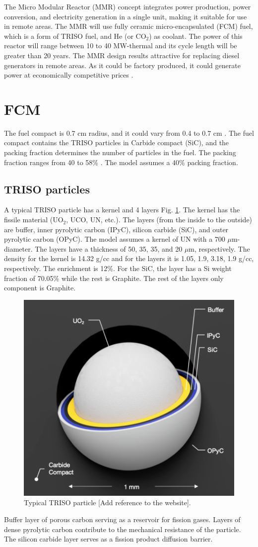 The Micro Modular Reactor (MMR) concept integrates power production, power conversion, and electricity generation in a single unit, making it suitable for use in remote areas. 
The MMR will use fully ceramic micro-encapsulated (FCM) fuel, which is a form of TRISO fuel, and He (or CO$_2$) as coolant.
The power of this reactor will range between 10 to 40 MW-thermal and its cycle length will be greater than 20 years.
The MMR design results attractive for replacing diesel generators in remote areas. As it could be factory produced, it could generate power at economically competitive prices \cite{hawari_development_2018}.

\section{FCM}

The fuel compact is 0.7 cm radius, and it could vary from 0.4 to 0.7 cm \cite{powers_fully_2013}. The fuel compact contains the TRISO particles in Carbide compact (SiC), and the packing fraction determines the number of particles in the fuel. The packing fraction ranges from 40 to 58\% \cite{powers_fully_2013}. The model assumes a 40\% packing fraction.

\subsection{TRISO particles}

A typical TRISO particle has a kernel and 4 layers Fig. \ref{fig:triso}. The kernel has the fissile material (UO$_2$, UCO, UN, etc.). The layers (from the inside to the outside) are buffer, inner pyrolytic carbon (IPyC), silicon carbide (SiC), and outer pyrolytic carbon (OPyC).
The model assumes a kernel of UN with a 700 $\mu$m-diameter. The layers have a thickness of 50, 35, 35, and 20 $\mu$m, respectively.
The density for the kernel is 14.32 g/cc and for the layers it is 1.05, 1.9, 3.18, 1.9 g/cc, respectively. The enrichment is 12\%. For the SiC, the layer has a Si weight fraction of 70.05\% while the rest is Graphite. The rest of the layers only component is Graphite.

\begin{figure}[H]
	\centering
	\includegraphics[width=0.5\linewidth]{figures/triso1.png}
	\hfill
	\caption{Typical TRISO particle [Add reference to the website].}
	\label{fig:triso}
\end{figure}

Buffer layer of porous carbon serving as a reservoir for fission gases.
Layers of dense pyrolytic carbon contribute to the mechanical resistance of the particle.
The silicon carbide layer serves as a fission product diffusion barrier.
\cite{france_gas-cooled_2006}